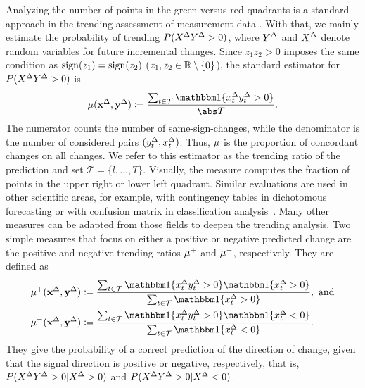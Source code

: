Analyzing the number of points in the green versus red quadrants is a standard approach in the trending assessment of measurement data \parencite{Critchley2010,Saugel2015}. 
With that, we mainly estimate the probability of trending $P(X^{\Delta} Y^{\Delta} > 0)$, where $Y^{\Delta}$ and $X^{\Delta}$ denote random variables for future incremental changes.
Since $z_1 z_2 > 0$ imposes the same condition as $\operatorname{sign}(z_1) = \operatorname{sign}(z_2)$ ($z_1, z_2 \in \mathbb{R} \setminus \{ 0 \}$), the standard estimator for $P(X^{\Delta} Y^{\Delta} > 0)$ is
\begin{equation}
    \acc (\diffx, \diffy) \coloneqq \frac{\sum_{t \in \mathcal{T}} \ind{\diffxt \diffyt > 0}}{\card{T}}.\label{eq:acc}
\end{equation}
The numerator counts the number of same-sign-changes, while the denominator is the number of considered pairs $(y^{\Delta}_{t}, x^{\Delta}_{t})$.
Thus, $\mu$ is the proportion of concordant changes on all changes.
We refer to this estimator as the trending ratio of the prediction and set $\mathcal{T} = \{l, \dots, T\}$. 
Visually, the measure computes the fraction of points in the upper right or lower left quadrant.
Similar evaluations are used in other scientific areas, for example, with contingency tables in dichotomous forecasting or with confusion matrix in classification analysis~\parencites(see, e.g., the introductions in)()[Ch. 4]{James2021}[Ch. 3]{Jolliffe2012}.
Many other measures can be adapted from those fields to deepen the trending analysis.
Two simple measures that focus on either a positive or negative predicted change are the positive and negative trending ratios $\mu^+$ and $\mu^-$, respectively.
They are defined as
\begin{align}
    \accp (\diffx, \diffy) &\coloneqq \frac{\sum_{t \in \mathcal{T}} \ind{\diffxt \diffyt > 0} \ind{\diffxt > 0}}{\sum_{t \in \mathcal{T}} \ind{\diffxt > 0}},\ \text{and} \label{eq:accp}\\
    \accm (\diffx, \diffy) &\coloneqq \frac{\sum_{t \in \mathcal{T}} \ind{\diffxt \diffyt > 0} \ind{\diffxt < 0}}{\sum_{t \in \mathcal{T}} \ind{\diffxt < 0}}.\label{eq:accm}
\end{align}
They give the probability of a correct prediction of the direction of change, given that the signal direction is positive or negative, respectively, that is, $P(X^{\Delta} Y^{\Delta} > 0 | X^{\Delta} > 0)$ and $P(X^{\Delta} Y^{\Delta} > 0 | X^{\Delta} < 0)$.

